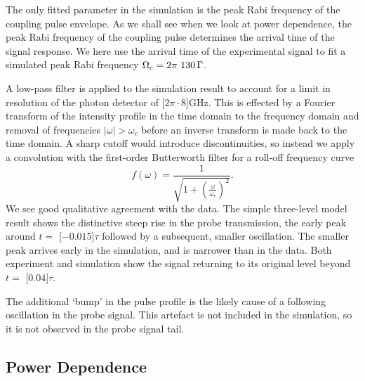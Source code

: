     The only fitted parameter in the simulation is the peak Rabi frequency of the
    coupling pulse envelope. As we shall see when we look at power dependence, the
    peak Rabi frequency of the coupling pulse determines the arrival time of the
    signal response. We here use the arrival time of the experimental signal to fit
    a simulated peak Rabi frequency $\Omega_c = \unit[2\pi~130]{\Gamma}$.

    A low-pass filter is applied to the simulation result to account for a limit
    in resolution of the photon detector of \unit[$2\pi \cdot 8$]{GHz}. This is
    effected by a Fourier transform of the intensity profile in the time domain
    to the frequency domain and removal of frequencies $\lvert \omega \rvert >
    \omega_c$ before an inverse transform is made back to the time domain. A
    sharp cutoff would introduce discontinuities, so instead we apply a
    convolution with the first-order Butterworth filter\cite{Butterworth1930}
    for a roll-off frequency curve
    \begin{equation}
        f(\omega) = \frac{1}{\sqrt{1 + 
                      \left( \frac{\omega}{\omega_c} \right)^2}}.
    \end{equation}
    We see good qualitative agreement with the data. The simple three-level model
    result shows the distinctive steep rise in the probe transmission, the early
    peak around $t = $ \unit[$-0.015$]{$\tau$} followed by a subsequent, smaller
    oscillation. The smaller peak arrives early in the simulation, and is narrower
    than in the data. Both experiment and simulation show the signal returning to
    its original level beyond $t = $ \unit[$0.04$]{$\tau$}.

    The additional `bump' in the pulse profile is the likely cause of a
    following oscillation in the probe signal. This artefact is not included in
    the simulation, so it is not observed in the probe signal tail.

  \subsection{Power Dependence}


